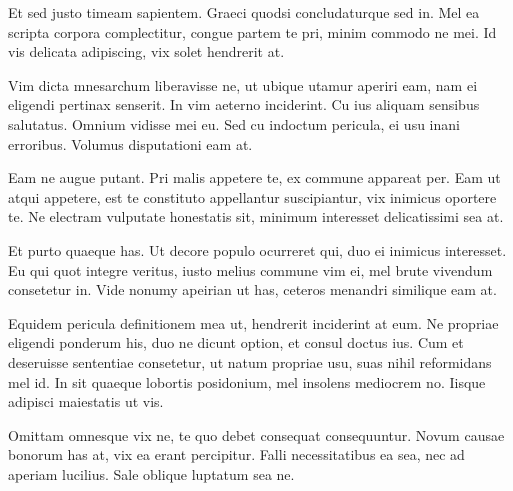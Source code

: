 \documentclass[12pt, a4paper]{article}
\theoremstyle{definition}
\theoremstyle{remark}
\numberwithin{equation}{section}
\numberwithin{figure}{section}
\numberwithin{table}{section}
\begin{document}
        Et sed justo timeam sapientem. Graeci quodsi concludaturque sed in. Mel ea scripta corpora complectitur, congue partem te pri, minim commodo ne mei. Id vis delicata adipiscing, vix solet hendrerit at.

        Vim dicta mnesarchum liberavisse ne, ut ubique utamur aperiri eam, nam ei eligendi pertinax senserit. In vim aeterno inciderint. Cu ius aliquam sensibus salutatus. Omnium vidisse mei eu. Sed cu indoctum pericula, ei usu inani erroribus. Volumus disputationi eam at.

        Eam ne augue putant. Pri malis appetere te, ex commune appareat per. Eam ut atqui appetere, est te constituto appellantur suscipiantur, vix inimicus oportere te. Ne electram vulputate honestatis sit, minimum interesset delicatissimi sea at.

        Et purto quaeque has. Ut decore populo ocurreret qui, duo ei inimicus interesset. Eu qui quot integre veritus, iusto melius commune vim ei, mel brute vivendum consetetur in. Vide nonumy apeirian ut has, ceteros menandri similique eam at.

        Equidem pericula definitionem mea ut, hendrerit inciderint at eum. Ne propriae eligendi ponderum his, duo ne dicunt option, et consul doctus ius. Cum et deseruisse sententiae consetetur, ut natum propriae usu, suas nihil reformidans mel id. In sit quaeque lobortis posidonium, mel insolens mediocrem no. Iisque adipisci maiestatis ut vis.

        Omittam omnesque vix ne, te quo debet consequat consequuntur. Novum causae bonorum has at, vix ea erant percipitur. Falli necessitatibus ea sea, nec ad aperiam lucilius. Sale oblique luptatum sea ne.
\end{document}
